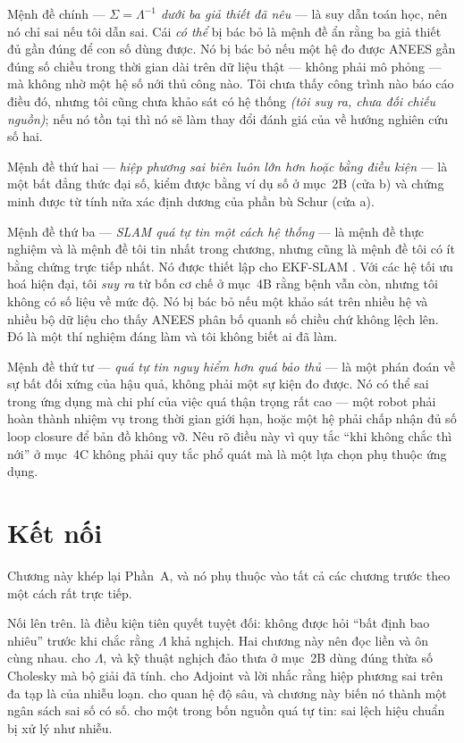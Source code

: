 \documentclass[../../vslam.tex]{subfiles}
\begin{document}
Mệnh đề chính --- \emph{\(\Sigma = \Lambda^{-1}\) dưới ba giả thiết đã nêu} --- là suy dẫn toán học, nên nó chỉ sai nếu tôi dẫn sai. Cái \emph{có thể} bị bác bỏ là mệnh đề ẩn rằng ba giả thiết đủ gần đúng để con số dùng được. Nó bị bác bỏ nếu một hệ đo được ANEES gần đúng số chiều trong thời gian dài trên dữ liệu thật --- không phải mô phỏng --- mà không nhờ một hệ số nới thủ công nào. Tôi chưa thấy công trình nào báo cáo điều đó, nhưng tôi cũng chưa khảo sát có hệ thống \emph{(tôi suy ra, chưa đối chiếu nguồn)}; nếu nó tồn tại thì nó sẽ làm thay đổi đánh giá của  về hướng nghiên cứu số hai.

Mệnh đề thứ hai --- \emph{hiệp phương sai biên luôn lớn hơn hoặc bằng điều kiện} --- là một bất đẳng thức đại số, kiểm được bằng ví dụ số ở mục~2B (cửa b) và chứng minh được từ tính nửa xác định dương của phần bù Schur (cửa a).

Mệnh đề thứ ba --- \emph{SLAM quá tự tin một cách hệ thống} --- là mệnh đề thực nghiệm và là mệnh đề tôi tin nhất trong chương, nhưng cũng là mệnh đề tôi có ít bằng chứng trực tiếp nhất. Nó được thiết lập cho EKF-SLAM \cite{huang2008fej,hesch2014consistency}. Với các hệ tối ưu hoá hiện đại, tôi \emph{suy ra} từ bốn cơ chế ở mục~4B rằng bệnh vẫn còn, nhưng tôi không có số liệu về mức độ. Nó bị bác bỏ nếu một khảo sát trên nhiều hệ và nhiều bộ dữ liệu cho thấy ANEES phân bố quanh số chiều chứ không lệch lên. Đó là một thí nghiệm đáng làm và tôi không biết ai đã làm.

Mệnh đề thứ tư --- \emph{quá tự tin nguy hiểm hơn quá bảo thủ} --- là một phán đoán về sự bất đối xứng của hậu quả, không phải một sự kiện đo được. Nó có thể sai trong ứng dụng mà chi phí của việc quá thận trọng rất cao --- một robot phải hoàn thành nhiệm vụ trong thời gian giới hạn, hoặc một hệ phải chấp nhận đủ số loop closure để bản đồ không vỡ. Nêu rõ điều này vì quy tắc ``khi không chắc thì nới'' ở mục~4C không phải quy tắc phổ quát mà là một lựa chọn phụ thuộc ứng dụng.

\section{Kết nối}

Chương này khép lại Phần~A, và nó phụ thuộc vào tất cả các chương trước theo một cách rất trực tiếp.

Nối lên trên.  là điều kiện tiên quyết tuyệt đối: không được hỏi ``bất định bao nhiêu'' trước khi chắc rằng \(\Lambda\) khả nghịch. Hai chương này nên đọc liền và ôn cùng nhau.  cho \(\Lambda\), và kỹ thuật nghịch đảo thưa ở mục~2B dùng đúng thừa số Cholesky mà bộ giải đã tính.  cho Adjoint và lời nhắc rằng hiệp phương sai trên đa tạp là của nhiễu loạn.  cho quan hệ độ sâu, và chương này biến nó thành một ngân sách sai số có số.  cho một trong bốn nguồn quá tự tin: sai lệch hiệu chuẩn bị xử lý như nhiễu.
\end{document}

